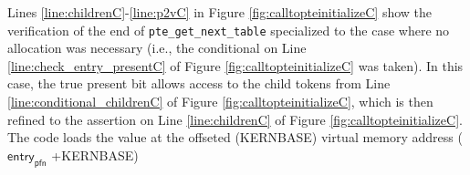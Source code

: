 Lines \ref{line:childrenC}-\ref{line:p2vC} in Figure \ref{fig:calltopteinitializeC} show the verification of the end of \lstinline|pte_get_next_table| specialized to the case where no allocation was necessary (i.e., the conditional on Line \ref{line:check_entry_presentC} of Figure \ref{fig:calltopteinitializeC} was taken).
In this case, the true present bit allows access to the child tokens from Line \ref{line:conditional_childrenC} of Figure \ref{fig:calltopteinitializeC},
which is then refined to the assertion on Line \ref{line:childrenC} of Figure \ref{fig:calltopteinitializeC}.
The code loads the value at the offseted (\textsf{KERNBASE}) virtual memory address ($\textsf{entry}_{\textsf{pfn}}$ \textsf{+KERNBASE})
